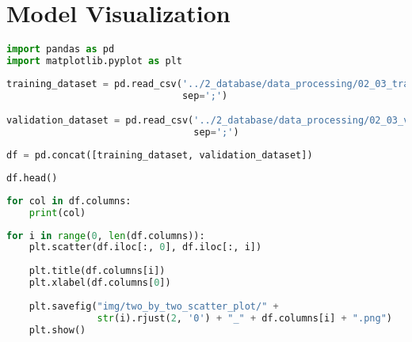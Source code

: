 \hypertarget{model-visualization}{%
\section{Model Visualization}\label{model-visualization}}

\begin{lstlisting}[language=Python]
import pandas as pd
import matplotlib.pyplot as plt
\end{lstlisting}

\begin{lstlisting}[language=Python]
training_dataset = pd.read_csv('../2_database/data_processing/02_03_training_dataset.csv',
                               sep=';')

validation_dataset = pd.read_csv('../2_database/data_processing/02_03_validation_dataset.csv',
                                 sep=';')
\end{lstlisting}

\begin{lstlisting}[language=Python]
df = pd.concat([training_dataset, validation_dataset])
\end{lstlisting}

\begin{lstlisting}[language=Python]
df.head()
\end{lstlisting}

\begin{lstlisting}[language=Python]
for col in df.columns:
    print(col)
\end{lstlisting}

\begin{lstlisting}[language=Python]
for i in range(0, len(df.columns)):
    plt.scatter(df.iloc[:, 0], df.iloc[:, i])
    
    plt.title(df.columns[i])
    plt.xlabel(df.columns[0])
    
    plt.savefig("img/two_by_two_scatter_plot/" + 
                str(i).rjust(2, '0') + "_" + df.columns[i] + ".png")
    plt.show()
\end{lstlisting}

